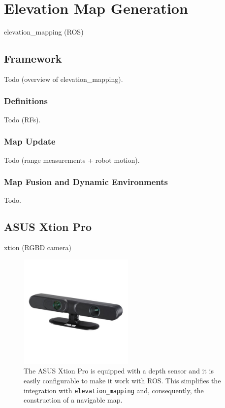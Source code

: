 \chapter{Elevation Map Generation}
elevation\_mapping (ROS) \cite{Fankhauser2018ProbabilisticTerrainMapping}

\section{Framework}
Todo (overview of elevation\_mapping).

\subsection{Definitions}
Todo (RFs).

\subsection{Map Update}
Todo (range measurements + robot motion).

\subsection{Map Fusion and Dynamic Environments}
Todo.

\section{ASUS Xtion Pro}
xtion (RGBD camera)
\begin{figure}
  \centering
  \includegraphics[width=0.5\textwidth]{figures/asus-xtion-pro.jpeg}
  \caption{The ASUS Xtion Pro is equipped with a depth sensor and it is 
      easily configurable to make it work with ROS. This simplifies the 
      integration with \texttt{elevation\_mapping} and, consequently, 
      the construction of a navigable map.}
  \label{fig:asus-xtion-pro}
\end{figure}

